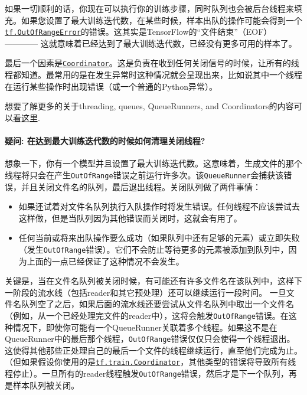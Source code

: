 如果一切顺利的话，你现在可以执行你的训练步骤，同时队列也会被后台线程来填充。如果您设置了最大训练迭代数，在某些时候，样本出队的操作可能会得到一个\href{../../api_docs/python/client.md\#OutOfRangeError}{\texttt{tf.OutOfRangeError}}的错误。这其实是TensorFlow的``文件结束''（EOF）
------------
这就意味着已经达到了最大训练迭代数，已经没有更多可用的样本了。

最后一个因素是\href{../../api_docs/python/train.md\#Coordinator}{\texttt{Coordinator}}。这是负责在收到任何关闭信号的时候，让所有的线程都知道。最常用的是在发生异常时这种情况就会呈现出来，比如说其中一个线程在运行某些操作时出现错误（或一个普通的Python异常）。

想要了解更多的关于threading, queues, QueueRunners, and
Coordinators的内容可以\href{../../how_tos/threading_and_queues/index.md}{看这里}.

\paragraph{疑问: 在达到最大训练迭代数的时候如何清理关闭线程?
}\label{ux7591ux95ee-ux5728ux8fbeux5230ux6700ux5927ux8badux7ec3ux8fedux4ee3ux6570ux7684ux65f6ux5019ux5982ux4f55ux6e05ux7406ux5173ux95edux7ebfux7a0b}

想象一下，你有一个模型并且设置了最大训练迭代数。这意味着，生成文件的那个线程将只会在产生\texttt{OutOfRange}错误之前运行许多次。该\texttt{QueueRunner}会捕获该错误，并且关闭文件名的队列，最后退出线程。关闭队列做了两件事情：

\begin{itemize}
\tightlist
\item
  如果还试着对文件名队列执行入队操作时将发生错误。任何线程不应该尝试去这样做，但是当队列因为其他错误而关闭时，这就会有用了。
\item
  任何当前或将来出队操作要么成功（如果队列中还有足够的元素）或立即失败（发生\texttt{OutOfRange}错误）。它们不会防止等待更多的元素被添加到队列中，因为上面的一点已经保证了这种情况不会发生。
\end{itemize}

关键是，当在文件名队列被关闭时候，有可能还有许多文件名在该队列中，这样下一阶段的流水线（包括reader和其它预处理）还可以继续运行一段时间。
一旦文件名队列空了之后，如果后面的流水线还要尝试从文件名队列中取出一个文件名（例如，从一个已经处理完文件的reader中），这将会触发\texttt{OutOfRange}错误。在这种情况下，即使你可能有一个QueueRunner关联着多个线程。如果这不是在QueueRunner中的最后那个线程，\texttt{OutOfRange}错误仅仅只会使得一个线程退出。这使得其他那些正处理自己的最后一个文件的线程继续运行，直至他们完成为止。
（但如果假设你使用的是\href{../../api_docs/python/train.md\#Coordinator}{\texttt{tf.train.Coordinator}}，其他类型的错误将导致所有线程停止）。一旦所有的reader线程触发\texttt{OutOfRange}错误，然后才是下一个队列，再是样本队列被关闭。

